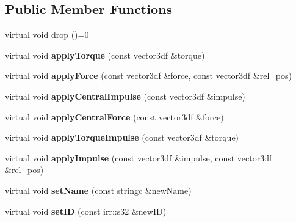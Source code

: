 \subsection*{Public Member Functions}
\begin{DoxyCompactItemize}
\item 
virtual void \hyperlink{class_c_irr_b_p_rigid_body_a961d442e36e78260e7a6f203fd0c11e9}{drop} ()=0
\item 
\hypertarget{class_c_irr_b_p_rigid_body_a93948bb4c79cea0b3172c5fe1146007c}{
virtual void {\bfseries applyTorque} (const vector3df \&torque)}
\label{class_c_irr_b_p_rigid_body_a93948bb4c79cea0b3172c5fe1146007c}

\item 
\hypertarget{class_c_irr_b_p_rigid_body_aa3fbb7492486b64b0f53e3243f20d3db}{
virtual void {\bfseries applyForce} (const vector3df \&force, const vector3df \&rel\_\-pos)}
\label{class_c_irr_b_p_rigid_body_aa3fbb7492486b64b0f53e3243f20d3db}

\item 
\hypertarget{class_c_irr_b_p_rigid_body_a4697f05241c551fbd80d2786507ceed4}{
virtual void {\bfseries applyCentralImpulse} (const vector3df \&impulse)}
\label{class_c_irr_b_p_rigid_body_a4697f05241c551fbd80d2786507ceed4}

\item 
\hypertarget{class_c_irr_b_p_rigid_body_aea6add503a694f1b54f9b406217416d1}{
virtual void {\bfseries applyCentralForce} (const vector3df \&force)}
\label{class_c_irr_b_p_rigid_body_aea6add503a694f1b54f9b406217416d1}

\item 
\hypertarget{class_c_irr_b_p_rigid_body_a633f6f306f2b061870c78ae5137fe238}{
virtual void {\bfseries applyTorqueImpulse} (const vector3df \&torque)}
\label{class_c_irr_b_p_rigid_body_a633f6f306f2b061870c78ae5137fe238}

\item 
\hypertarget{class_c_irr_b_p_rigid_body_a7cda3cfa35a7b6325b67bc48cc1adcdb}{
virtual void {\bfseries applyImpulse} (const vector3df \&impulse, const vector3df \&rel\_\-pos)}
\label{class_c_irr_b_p_rigid_body_a7cda3cfa35a7b6325b67bc48cc1adcdb}

\item 
\hypertarget{class_c_irr_b_p_rigid_body_a4589194ec0bd56b062fdf9d36a21afea}{
virtual void {\bfseries setName} (const stringc \&newName)}
\label{class_c_irr_b_p_rigid_body_a4589194ec0bd56b062fdf9d36a21afea}

\item 
\hypertarget{class_c_irr_b_p_rigid_body_ae181ccf9a9a5e192b29d4670b65612f2}{
virtual void {\bfseries setID} (const irr::s32 \&newID)}
\label{class_c_irr_b_p_rigid_body_ae181ccf9a9a5e192b29d4670b65612f2}


\end{DoxyCompactItemize}
